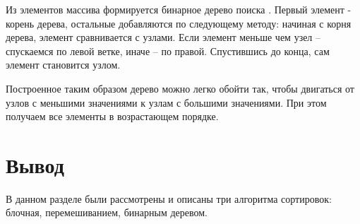 Из элементов массива формируется бинарное дерево поиска \cite{tree}. Первый элемент - корень дерева, остальные добавляются по следующему методу: начиная с корня дерева, элемент сравнивается с узлами. Если элемент меньше чем узел -- спускаемся по левой ветке, иначе -- по правой. Спустившись до конца, сам элемент становится узлом.

Построенное таким образом дерево можно легко обойти так, чтобы двигаться от узлов с меньшими значениями к узлам с большими значениями. При этом получаем все элементы в возрастающем порядке.

\section{Вывод}

В данном разделе были рассмотрены и описаны три алгоритма сортировок: блочная, перемешиванием, бинарным деревом. 
